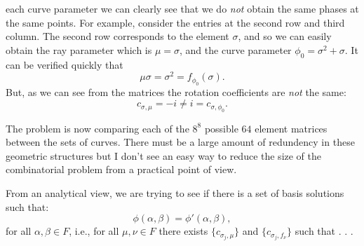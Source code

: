 \documentclass[a4paper]{article}
\begin{document}
  each curve parameter we can clearly see that we do
  \textit{not} obtain the same phases at the same points.
  For example, consider the entries at the second row and
  third column. The second row corresponds to the element
  $\sigma$, and so we can easily obtain the ray parameter
  which is $\mu = \sigma$, and the curve parameter $\phi_0 =
  \sigma^2 + \sigma$. It can be verified quickly that
  \begin{equation}
    \mu \sigma = \sigma^2 = f_{\phi_0}(\sigma).
  \end{equation}
  But, as we can see from the matrices the rotation
  coefficients are \textit{not} the same:
  \begin{equation}
    c_{\sigma,\mu} = -i \neq i = c_{\sigma,\phi_0}.
  \end{equation}

  The problem is now comparing each of the $8^8$ possible
  $64$ element matrices between the sets of curves.  There
  must be a large amount of redundency in these geometric
  structures but I don't see an easy way to reduce the size
  of the combinatorial problem from a practical point of
  view.


  From an analytical view, we are trying to see if there is
  a set of basis solutions such that:
  \begin{equation}
    \phi(\alpha,\beta) = \phi'(\alpha,\beta),
  \end{equation}
  for all $\alpha,\beta \in F$, i.e., for all $\mu,\nu \in
  F$ there exists $\{c_{\sigma_j,\mu}\}$ and
  $\{c_{\sigma_j,f_\nu}\}$ such that . . . 
\end{document}
